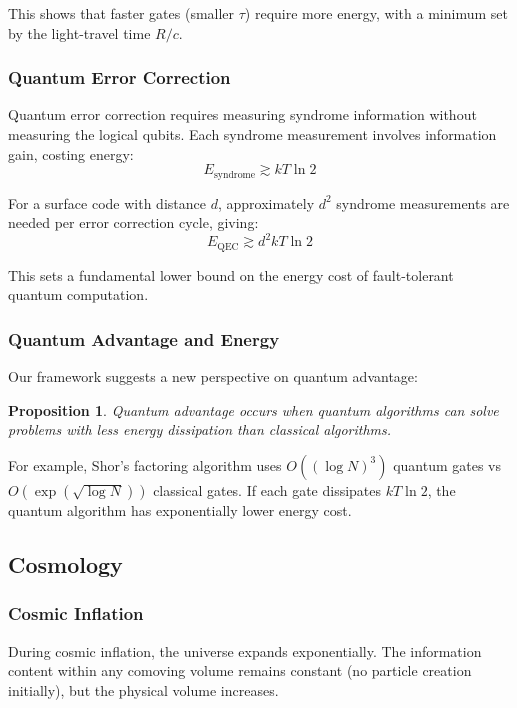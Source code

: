 \documentclass[11pt,a4paper]{article}
\theoremstyle{plain}
\newtheorem{proposition}[theorem]{Proposition}
\theoremstyle{definition}
\theoremstyle{remark}
\begin{document}
This shows that faster gates (smaller $\tau$) require more energy, with a minimum set by the light-travel time $R/c$.

\subsubsection{Quantum Error Correction}

Quantum error correction requires measuring syndrome information without measuring the logical qubits. Each syndrome measurement involves information gain, costing energy:
\begin{equation}
E_{\text{syndrome}} \gtrsim kT\ln 2
\end{equation}

For a surface code with distance $d$, approximately $d^2$ syndrome measurements are needed per error correction cycle, giving:
\begin{equation}
E_{\text{QEC}} \gtrsim d^2 kT\ln 2
\end{equation}

This sets a fundamental lower bound on the energy cost of fault-tolerant quantum computation.

\subsubsection{Quantum Advantage and Energy}

Our framework suggests a new perspective on quantum advantage:

\begin{proposition}
Quantum advantage occurs when quantum algorithms can solve problems with less energy dissipation than classical algorithms.
\end{proposition}

For example, Shor's factoring algorithm uses $O((\log N)^3)$ quantum gates vs $O(\exp(\sqrt{\log N}))$ classical gates. If each gate dissipates $kT\ln 2$, the quantum algorithm has exponentially lower energy cost.

\subsection{Cosmology}

\subsubsection{Cosmic Inflation}

During cosmic inflation, the universe expands exponentially. The information content within any comoving volume remains constant (no particle creation initially), but the physical volume increases.
\end{document}
